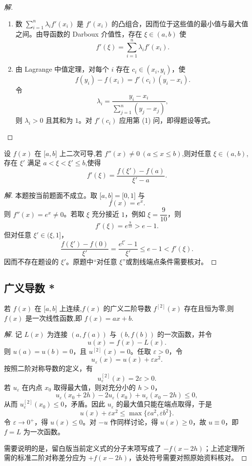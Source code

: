 \documentclass[../../数学分析培优讲义(答案版).tex]{subfiles}
\begin{document}
\begin{proof}[解]
\begin{enumerate}[label=(\arabic*)]
    \item 数 $\displaystyle\sum\limits_{i=1}^{n}\lambda_i f'(x_i)$ 是 $f'(x_i)$ 的凸组合，因而位于这些值的最小值与最大值之间。由导函数的 Darboux 介值性，存在 $\xi\in(a,b)$ 使
    \[
        f'(\xi)=\sum\limits_{i=1}^{n}\lambda_i f'(x_i).
    \]
    \item 由 Lagrange 中值定理，对每个 $i$ 存在 $c_i\in(x_i,y_i)$，使
    \[
        f(y_i)-f(x_i)=f'(c_i)(y_i-x_i).
    \]
    令
    \[
        \lambda_i=\dfrac{y_i-x_i}{\displaystyle\sum\limits_{j=1}^{n}(y_j-x_j)},
    \]
    则 $\lambda_i>0$ 且其和为 $1$。对 $f'(c_i)$ 应用第 (1) 问，即得题设等式。
\end{enumerate}
\end{proof}

\begin{example}
设 $f(x)$ 在 $\lbrack a,b\rbrack$ 上二次可导,若 $f''(x)\neq0\ (a\leq x\leq b)$,则对任意 $\xi\in(a,b)$,存在 $\xi'$ 满足 $a<\xi<\xi'\leq b$,使得
\[
    f'(\xi)=\dfrac{f(\xi')-f(a)}{\xi'-a}.
\]
\end{example}

\begin{proof}[解]
本题按当前题面不成立。取 $\lbrack a,b\rbrack=\lbrack0,1\rbrack$ 与
\[
    f(x)=e^x.
\]
则 $f''(x)=e^x\neq0$。若取 $\xi$ 充分接近 $1$，例如 $\xi=\dfrac{9}{10}$，则
\[
    f'(\xi)=e^{\frac{9}{10}}>e-1.
\]
但对任意 $\xi'\in(\xi,1\rbrack$，
\[
    \dfrac{f(\xi')-f(0)}{\xi'}
    =\dfrac{e^{\xi'}-1}{\xi'}
    \leq e-1<f'(\xi).
\]
因而不存在题设的 $\xi'$。原题中“对任意 $\xi$”或割线端点条件需要核对。
\end{proof}

\subsection{广义导数 *}

\begin{example}
若 $f(x)$ 在 $\lbrack a,b\rbrack$ 上连续,$f(x)$ 的广义二阶导数 $f^{[2]}(x)$ 存在且恒为零,则 $f(x)$ 是一次线性函数,即 $f(x)=ax+b$.
\end{example}

\begin{proof}[解]
记 $L(x)$ 为连接 $(a,f(a))$ 与 $(b,f(b))$ 的一次函数，并令
\[
    u(x)=f(x)-L(x).
\]
则 $u(a)=u(b)=0$，且 $u^{[2]}(x)=0$。任取 $\varepsilon>0$，令
\[
    u_{\varepsilon}(x)=u(x)+\varepsilon x^2.
\]
按照二阶对称导数的定义，有
\[
    u_{\varepsilon}^{[2]}(x)=2\varepsilon>0.
\]
若 $u_{\varepsilon}$ 在内点 $x_0$ 取得最大值，则对充分小的 $h>0$，
\[
    u_{\varepsilon}(x_0+2h)-2u_{\varepsilon}(x_0)
    +u_{\varepsilon}(x_0-2h)\leq0,
\]
从而 $u_{\varepsilon}^{[2]}(x_0)\leq0$，矛盾。因此 $u_{\varepsilon}$ 的最大值只能在端点取得，于是
\[
    u(x)+\varepsilon x^2
    \leq\max\{\varepsilon a^2,\varepsilon b^2\}.
\]
令 $\varepsilon\to0^+$，得 $u(x)\leq0$。对 $-u$ 作同样讨论，得 $u(x)\geq0$，故 $u\equiv0$，即 $f=L$ 为一次函数。

需要说明的是，留白版当前定义式的分子末项写成了 $-f(x-2h)$；上述定理所需的标准二阶对称差分应为 $+f(x-2h)$，该处符号需要对照原始资料核对。
\end{proof}
\end{document}
